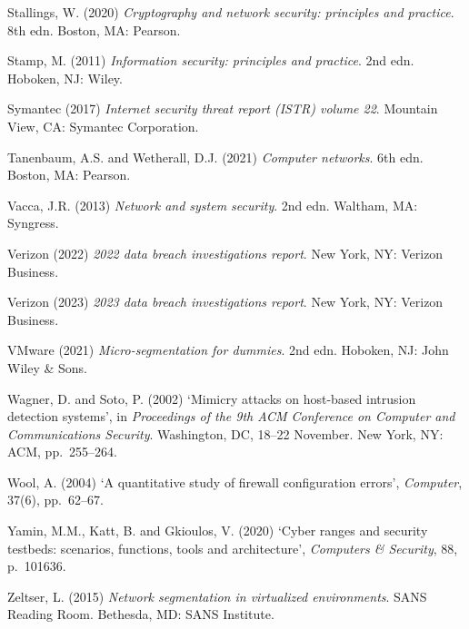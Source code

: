Stallings, W. (2020) \textit{Cryptography and network security: principles and practice}. 8th edn. Boston, MA: Pearson.

Stamp, M. (2011) \textit{Information security: principles and practice}. 2nd edn. Hoboken, NJ: Wiley.

Symantec (2017) \textit{Internet security threat report (ISTR) volume 22}. Mountain View, CA: Symantec Corporation.

Tanenbaum, A.S. and Wetherall, D.J. (2021) \textit{Computer networks}. 6th edn. Boston, MA: Pearson.

Vacca, J.R. (2013) \textit{Network and system security}. 2nd edn. Waltham, MA: Syngress.

Verizon (2022) \textit{2022 data breach investigations report}. New York, NY: Verizon Business.

Verizon (2023) \textit{2023 data breach investigations report}. New York, NY: Verizon Business.

VMware (2021) \textit{Micro-segmentation for dummies}. 2nd edn. Hoboken, NJ: John Wiley \& Sons.

Wagner, D. and Soto, P. (2002) `Mimicry attacks on host-based intrusion detection systems', in \textit{Proceedings of the 9th ACM Conference on Computer and Communications Security}. Washington, DC, 18--22 November. New York, NY: ACM, pp.~255--264.

Wool, A. (2004) `A quantitative study of firewall configuration errors', \textit{Computer}, 37(6), pp.~62--67.

Yamin, M.M., Katt, B. and Gkioulos, V. (2020) `Cyber ranges and security testbeds: scenarios, functions, tools and architecture', \textit{Computers \& Security}, 88, p.~101636.

Zeltser, L. (2015) \textit{Network segmentation in virtualized environments}. SANS Reading Room. Bethesda, MD: SANS Institute.

\endgroup
